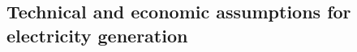 \begin{landscape}
\subsection{Technical and economic assumptions for electricity generation}
















\end{landscape}